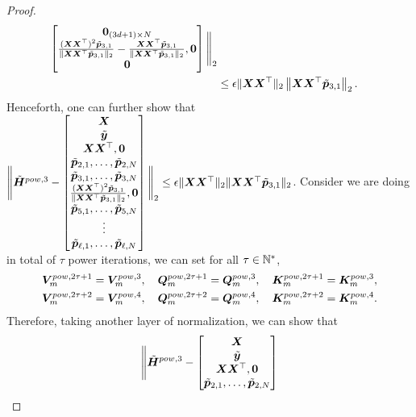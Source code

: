 \begin{proof}
\begin{align*}
\begin{bmatrix}
          \boldsymbol{0}_{(3d+1)\times N}\\
          \frac{(\boldsymbol{X}\boldsymbol{X}^\top)^2\tilde{\boldsymbol{p}}_{3,1}}{\Vert\boldsymbol{X}\boldsymbol{X}^\top\tilde{\boldsymbol{p}}_{3,1}\Vert_2}-\frac{\boldsymbol{X}\boldsymbol{X}^\top\tilde{\boldsymbol{p}}_{3,1}}{\Vert\boldsymbol{X}\boldsymbol{X}^\top\tilde{\boldsymbol{p}}_{3,1}\Vert_2},\boldsymbol{0}\\
          \boldsymbol{0}
      \end{bmatrix}\Bigg\Vert_{2}\\
      &\leq\epsilon\Vert\boldsymbol{X}\boldsymbol{X}^\top\Vert_2\left\Vert\boldsymbol{X}\boldsymbol{X}^\top\tilde{\boldsymbol{p}}_{3,1}\right\Vert_2.
    \end{align*}
    Henceforth, one can further show that
$      \Bigg\Vert \tilde{\boldsymbol{H}}^{pow,3}- \begin{bmatrix}
            \boldsymbol{X}\\
            \tilde{\boldsymbol{y}}\\
            \boldsymbol{X}\boldsymbol{X}^\top,\boldsymbol{0}\\
            \tilde{\boldsymbol{p}}_{2,1},\ldots,\tilde{\boldsymbol{p}}_{2,N}\\
            \tilde{\boldsymbol{p}}_{3,1},\ldots,\tilde{\boldsymbol{p}}_{3,N}\\
            \frac{(\boldsymbol{X}\boldsymbol{X}^\top)^2\tilde{\boldsymbol{p}}_{3,1}}{\Vert\boldsymbol{X}\boldsymbol{X}^\top\tilde{\boldsymbol{p}}_{3,1}\Vert_2},\boldsymbol{0}\\
            \tilde{\boldsymbol{p}}_{5,1},\ldots,\tilde{\boldsymbol{p}}_{5,N}\\
            \vdots\\
            \tilde{\boldsymbol{p}}_{\ell,1},\ldots,\tilde{\boldsymbol{p}}_{\ell,N}
        \end{bmatrix}\Bigg\Vert_{2}\leq\epsilon \Vert\boldsymbol{X}\boldsymbol{X}^\top\Vert_2\Vert\boldsymbol{X}\boldsymbol{X}^\top\tilde{\boldsymbol{p}}_{3,1}\Vert_2$.
    Consider we are doing in total of $\tau$ power iterations, we can set for all $\tau\in\mathbb{N}^*$,
    \begin{align*}
        &\boldsymbol{V}_m^{pow,2\tau+1}=\boldsymbol{V}_m^{pow,3},\quad \boldsymbol{Q}_m^{pow,2\tau+1}=\boldsymbol{Q}_m^{pow,3},\quad\boldsymbol{K}_m^{pow,2\tau+1}=\boldsymbol{K}_m^{pow,3},\\
        &\boldsymbol{V}_m^{pow,2\tau+2}=\boldsymbol{V}_m^{pow,4},\quad\boldsymbol{Q}_m^{pow,2\tau+2}=\boldsymbol{Q}_m^{pow,4},\quad\boldsymbol{K}_m^{pow,2\tau+2}=\boldsymbol{K}_m^{pow,4}.
    \end{align*}
    Therefore, taking another layer of normalization, we can show that
    \begin{align*}
        \Bigg\Vert \tilde{\boldsymbol{H}}^{pow,3}- \begin{bmatrix}
            \boldsymbol{X}\\
            \tilde{\boldsymbol{y}}\\
            \boldsymbol{X}\boldsymbol{X}^\top,\boldsymbol{0}\\
            \tilde{\boldsymbol{p}}_{2,1},\ldots,\tilde{\boldsymbol{p}}_{2,N}\\

\end{bmatrix}
\end{align*}
\end{proof}
